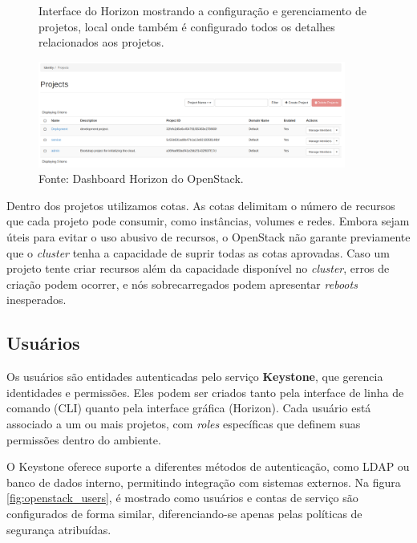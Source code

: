 \begin{figure}[htbp]
    \centering
    \caption{Interface do Horizon mostrando a configuração e gerenciamento de projetos, local onde também é configurado todos os detalhes relacionados aos projetos.}
    \includegraphics[width=0.9\textwidth]{images/openstack_projects.png}
    \caption*{Fonte: Dashboard Horizon do OpenStack.}
    \label{fig:openstack_projects}
\end{figure}

Dentro dos projetos utilizamos cotas. As cotas delimitam o número de recursos que cada projeto pode consumir, como instâncias, volumes e redes. Embora sejam úteis para evitar o uso abusivo de recursos, o OpenStack não garante previamente que o \textit{cluster} tenha a capacidade de suprir todas as cotas aprovadas. Caso um projeto tente criar recursos além da capacidade disponível no \textit{cluster}, erros de criação podem ocorrer, e nós sobrecarregados podem apresentar \textit{reboots} inesperados.

\subsection{Usuários}
Os usuários são entidades autenticadas pelo serviço \textbf{Keystone}, que gerencia identidades e permissões. Eles podem ser criados tanto pela interface de linha de comando (CLI) quanto pela interface gráfica (Horizon). Cada usuário está associado a um ou mais projetos, com \textit{roles} específicas que definem suas permissões dentro do ambiente.

O Keystone oferece suporte a diferentes métodos de autenticação, como LDAP ou banco de dados interno, permitindo integração com sistemas externos. Na figura \ref{fig:openstack_users}, é mostrado como usuários e contas de serviço são configurados de forma similar, diferenciando-se apenas pelas políticas de segurança atribuídas.

